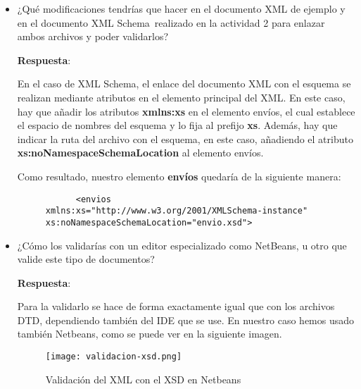 \begin{itemize}
    \item ¿Qué modificaciones tendrías que hacer en el documento XML de ejemplo y en el documento XML Schema realizado en la actividad 2 para enlazar ambos archivos y poder validarlos?

    \textbf{Respuesta}:

    En el caso de XML Schema, el enlace del documento XML con el esquema se realizan mediante atributos en el elemento principal del XML. En este caso, hay que añadir los atributos \textbf{xmlns:xs} en el elemento envíos, el cual establece el espacio de nombres del esquema y lo fija al prefijo \textbf{xs}. Además, hay que indicar la ruta del archivo con el esquema, en este caso, añadiendo el atributo \textbf{xs:noNamespaceSchemaLocation} al elemento envíos.

    Como resultado, nuestro elemento \textbf{envíos} quedaría de la siguiente manera:

    \begin{figure}[h]
        \begin{tcolorbox}[sharp corners, colback=yellow!30, colframe=white!20]
            \tiny
            \begin{verbatim}
      <envios xmlns:xs="http://www.w3.org/2001/XMLSchema-instance"  xs:noNamespaceSchemaLocation="envio.xsd">
            \end{verbatim}
        \end{tcolorbox}
    \end{figure}

    \item ¿Cómo los validarías con un editor especializado como NetBeans, u otro que valide este tipo de documentos?

    \textbf{Respuesta}:

    Para la validarlo se hace de forma exactamente igual que con los archivos DTD, dependiendo también del IDE que se use. En nuestro caso hemos usado también Netbeans, como se puede ver en la siguiente imagen.

        \begin{figure}[H]
        \centering
        \texttt{[image: validacion-xsd.png]}
        \caption{Validación del XML con el XSD en Netbeans}
    \end{figure}
\end{itemize}


%
%

